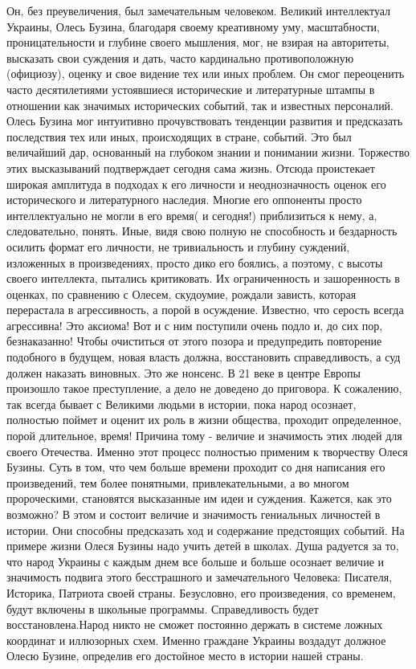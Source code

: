 Он, без преувеличения, был замечательным человеком. Великий интеллектуал
Украины, Олесь Бузина, благодаря своему креативному уму, масштабности,
проницательности и глубине своего мышления, мог, не взирая на авторитеты,
высказать свои суждения и дать, часто кардинально противоположную (официозу),
оценку и свое видение тех или иных проблем. Он смог переоценить часто
десятилетиями устоявшиеся исторические и литературные штампы в отношении как
значимых исторических событий, так и известных персоналий. Олесь Бузина мог
интуитивно прочувствовать тенденции развития и предсказать последствия тех или
иных, происходящих в стране, событий. Это был величайший дар, основанный на
глубоком знании и понимании жизни. Торжество этих высказываний подтверждает
сегодня сама жизнь. Отсюда проистекает широкая амплитуда в подходах к его
личности и неоднозначность оценок его исторического и литературного наследия.
Многие его оппоненты просто интеллектуально не могли в его время( и сегодня!)
приблизиться к нему, а, следовательно, понять. Иные, видя свою полную не
способность и бездарность осилить формат его личности, не тривиальность и
глубину суждений, изложенных в произведениях, просто дико его боялись, а
поэтому, с высоты своего интеллекта, пытались критиковать. Их ограниченность и
зашоренность в оценках, по сравнению с Олесем, скудоумие, рождали зависть,
которая перерастала в агрессивность, а порой в осуждение. Известно, что серость
всегда агрессивна! Это аксиома! Вот и с ним поступили очень подло и, до сих
пор, безнаказанно! Чтобы очиститься от этого позора и предупредить повторение
подобного в будущем, новая власть должна, восстановить справедливость, а суд
должен наказать виновных. Это же нонсенс. В 21 веке в центре Европы произошло
такое преступление, а дело не доведено до приговора. К сожалению, так всегда
бывает с Великими людьми в истории, пока народ осознает, полностью поймет и
оценит их роль в жизни общества, проходит определенное, порой длительное,
время! Причина тому - величие и значимость этих людей для своего Отечества.
Именно этот процесс полностью применим к творчеству Олеся Бузины. Суть в том,
что чем больше времени проходит со дня написания его произведений, тем более
понятными, привлекательными, а во многом пророческими, становятся высказанные
им идеи и суждения. Кажется, как это возможно? В этом и состоит величие и
значимость гениальных личностей в истории. Они способны предсказать ход и
содержание предстоящих событий. На примере жизни Олеся Бузины надо учить детей
в школах. Душа радуется за то, что народ Украины с каждым днем все больше и
больше осознает величие и значимость подвига этого бесстрашного и
замечательного Человека: Писателя, Историка, Патриота своей страны. Безусловно,
его произведения, со временем, будут включены в школьные программы.
Справедливость будет восстановлена.Народ никто не сможет постоянно держать в
системе ложных координат и иллюзорных схем. Именно граждане Украины воздадут
должное Олесю Бузине, определив его достойное место в истории нашей страны.

